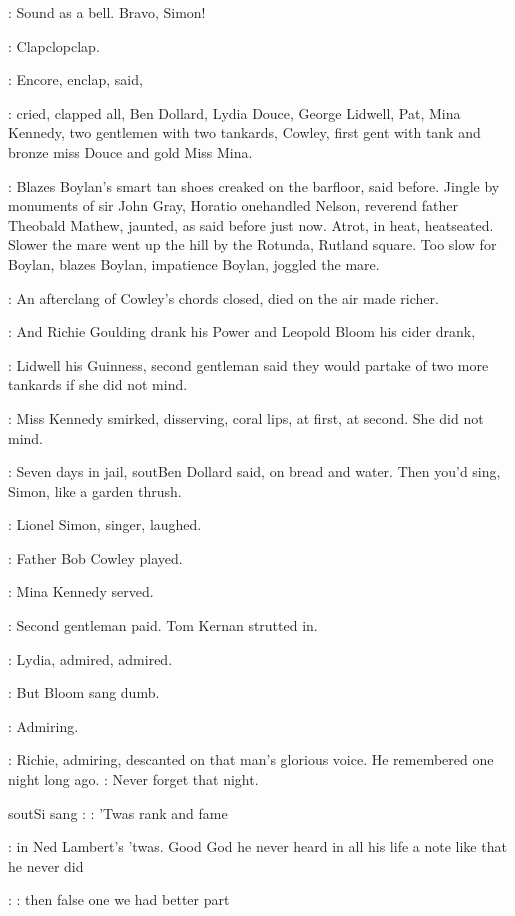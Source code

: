 \Lenehan:
Sound as a bell. Bravo, Simon!

:
Clapclopclap.

:
Encore, enclap, said,

:
cried, clapped all, Ben Dollard, Lydia Douce, George
Lidwell, Pat, Mina Kennedy, two gentlemen with two tankards, Cowley,
first gent with tank and bronze miss Douce
and gold Miss Mina.

:
Blazes Boylan's smart tan shoes creaked on the barfloor, said before.
Jingle by monuments of sir John Gray, Horatio onehandled Nelson,
reverend father Theobald Mathew, jaunted, as said before just now. Atrot,
in heat, heatseated.
Slower the mare
went up the hill by the Rotunda, Rutland square. Too slow for Boylan,
blazes Boylan, impatience Boylan, joggled the mare.

:
An afterclang of Cowley's chords closed, died on the air
made richer.

:
And Richie Goulding drank his Power and Leopold Bloom his cider
drank,

:
Lidwell his Guinness, second gentleman said they would partake of
two more tankards if she did not mind.

:
Miss Kennedy smirked, disserving,
coral lips, at first, at second. She did not mind.

\Dollard:
Seven days in jail,
sout{Ben Dollard said,}
on bread and water. Then you'd
sing, Simon, like a garden thrush.

:
Lionel Simon, singer, laughed.

:
Father Bob Cowley played.

:
Mina Kennedy served.

:
Second gentleman paid. Tom Kernan strutted in.

:
Lydia, admired, admired.

:
But Bloom sang dumb.

:
Admiring.

:
Richie, admiring, descanted on that man's glorious voice. He
remembered one night long ago.
\BloomInt:
Never forget that night.

sout{Si sang}
\Simon:
\Song:
'Twas rank and fame

\BloomInt:
in Ned Lambert's 'twas.
Good God he never heard in all his
life a note like that he never did

\Simon:
\Song:
then false one we had better part

